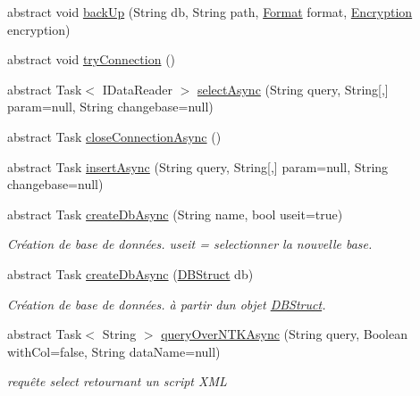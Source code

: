 \begin{DoxyCompactItemize}
\item 
abstract void \mbox{\hyperlink{class_n_t_k_1_1_database_1_1_n_t_k_database_aff31ebb22fb5b6a7f4542cccd93a94cc}{back\+Up}} (String db, String path, \mbox{\hyperlink{namespace_n_t_k_1_1_database_a9bed700210ca4ed5854002637b664789}{Format}} format, \mbox{\hyperlink{namespace_n_t_k_1_1_database_aa21afe93187a6c77c4ccdc988b3c4ac2}{Encryption}} encryption)
\item 
abstract void \mbox{\hyperlink{class_n_t_k_1_1_database_1_1_n_t_k_database_a8035cdddb04d0e90a712aa8e24abeb43}{try\+Connection}} ()
\item 
abstract Task$<$ I\+Data\+Reader $>$ \mbox{\hyperlink{class_n_t_k_1_1_database_1_1_n_t_k_database_a5312ea86e2516cae3a1c8a9921a76eba}{select\+Async}} (String query, String\mbox{[},\mbox{]} param=null, String changebase=null)
\item 
abstract Task \mbox{\hyperlink{class_n_t_k_1_1_database_1_1_n_t_k_database_a83ee63ae23c9736899f2b033db6d4838}{close\+Connection\+Async}} ()
\item 
abstract Task \mbox{\hyperlink{class_n_t_k_1_1_database_1_1_n_t_k_database_ae2aef1286ebefc38867f23bebfa25f64}{insert\+Async}} (String query, String\mbox{[},\mbox{]} param=null, String changebase=null)
\item 
abstract Task \mbox{\hyperlink{class_n_t_k_1_1_database_1_1_n_t_k_database_a9c291cc23a1cf3a5d97c812bb1909fcd}{create\+Db\+Async}} (String name, bool useit=true)
\begin{DoxyCompactList}\small\item\em Création de base de données. useit = selectionner la nouvelle base. \end{DoxyCompactList}\item 
abstract Task \mbox{\hyperlink{class_n_t_k_1_1_database_1_1_n_t_k_database_aa5b7134f819469db92bd39b61c97ad90}{create\+Db\+Async}} (\mbox{\hyperlink{class_n_t_k_1_1_database_1_1_d_b_struct}{D\+B\+Struct}} db)
\begin{DoxyCompactList}\small\item\em Création de base de données. à partir d\textquotesingle{}un objet \mbox{\hyperlink{class_n_t_k_1_1_database_1_1_d_b_struct}{D\+B\+Struct}}. \end{DoxyCompactList}\item 
abstract Task$<$ String $>$ \mbox{\hyperlink{class_n_t_k_1_1_database_1_1_n_t_k_database_a416973712b24c3d96e196b61767b75e6}{query\+Over\+N\+T\+K\+Async}} (String query, Boolean with\+Col=false, String data\+Name=null)
\begin{DoxyCompactList}\small\item\em requête select retournant un script X\+ML \end{DoxyCompactList}\item 

\end{DoxyCompactItemize}

